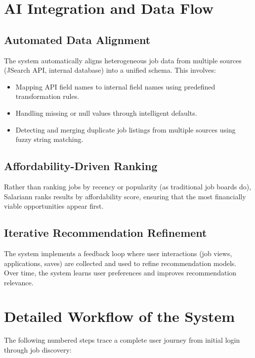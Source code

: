 \documentclass[12pt,a4paper,oneside]{report}
\begin{document}
\section{AI Integration and Data Flow}

\subsection{Automated Data Alignment}

The system automatically aligns heterogeneous job data from multiple sources (JSearch API, internal database) into a unified schema. This involves:
\begin{itemize}
    \item Mapping API field names to internal field names using predefined transformation rules.
    \item Handling missing or null values through intelligent defaults.
    \item Detecting and merging duplicate job listings from multiple sources using fuzzy string matching.
\end{itemize}

\subsection{Affordability-Driven Ranking}

Rather than ranking jobs by recency or popularity (as traditional job boards do), Salariann ranks results by affordability score, ensuring that the most financially viable opportunities appear first.

\subsection{Iterative Recommendation Refinement}

The system implements a feedback loop where user interactions (job views, applications, saves) are collected and used to refine recommendation models. Over time, the system learns user preferences and improves recommendation relevance.

\section{Detailed Workflow of the System}

The following numbered steps trace a complete user journey from initial login through job discovery:
\end{document}
